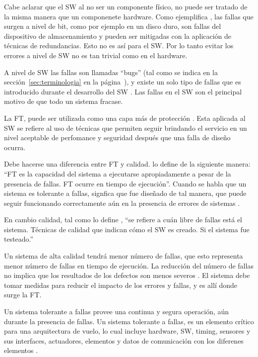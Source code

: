 Cabe aclarar que el \ac{SW} al no ser un componente físico, no puede ser tratado de la misma 
manera que un componenete hardware. Como ejemplifica \cite{SoftwareFaultToleranceATutorial}, las 
fallas que surgen a nivel de bit, como por ejemplo en un disco duro, son fallas del dispositivo de 
almacenamiento y pueden ser mitigadas con la aplicación de técnicas de redundancias. Esto no es así 
para el \ac{SW}. Por lo tanto evitar los errores a nivel de \ac{SW} no es tan trivial como 
en el hardware.

A nivel de \ac{SW} las fallas son llamadas ``bugs'' (tal como se indica en la
sección~\ref{sec:terminologia} en la página~\pageref{sec:terminologia}), y existe 
un solo tipo de fallas que es introducido durante el desarrollo del \ac{SW} 
\citep{SoftwareFaultToleranceATutorial}. Las fallas en el \ac{SW} son el principal motivo de que 
todo un sistema fracase. 

La \ac{FT}, puede ser utilizada como una capa más de protección 
\citep{SoftwareFaultToleranceATutorial}. Esta aplicada al \ac{SW} se refiere al uso de técnicas que 
permiten seguir brindando el servicio en un nivel aceptable de perfomance y seguridad después que 
una falla de diseño ocurra. 

Debe hacerse una diferencia entre \ac{FT} y calidad. \cite{Hanmer07} lo define de la 
siguiente manera: ``\ac{FT} es la capacidad del sistema a ejecutarse apropiadamente a 
pesar de la presencia de fallas. \ac{FT} ocurre en tiempo de ejecución''. Cuando se 
habla que un sistema es tolerante a fallas, signfica que fue diseñado de tal manera, que 
puede seguir funcionando correctamente aún en la presencia de errores de sistemas \citep{Hanmer07}. 

En cambio calidad, tal como lo define \cite{Hanmer07}, ``se refiere a cuán libre de fallas está el 
sistema. Técnicas de calidad que indican cómo el \ac{SW} es creado. Si el sistema fue testeado.'' 

Un sistema de alta calidad tendrá menor número de fallas, que esto representa menor número de 
fallas en tiempo de ejecución. La reducción del número de fallas no implica que los resultados de 
los defectos son menos severos \citep{Hanmer07}. El sistema debe tomar medidas para reducir el 
impacto de los errores y fallas, y es allí donde surge la \ac{FT}.	

Un sistema tolerante a fallas provee una continua y segura operación, aún durante la presencia 
de fallas. Un sistema tolerante a fallas, es un elemento crítico para una arquitectura de vuelo, lo 
cual incluye hardware, \ac{SW}, timing, sensores y sus interfaces, actuadores, elementos y datos 
de comunicación con los diferenes elementos \citep{FTAvionics}. 

